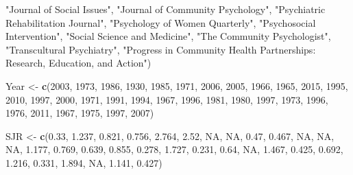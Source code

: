 \documentclass[]{tufte-handout}
\newenvironment{Shaded}{}{}
\newcommand{\KeywordTok}[1]{\textbf{{#1}}}
\newcommand{\DecValTok}[1]{{#1}}
\newcommand{\FloatTok}[1]{{#1}}
\newcommand{\StringTok}[1]{{#1}}
\newcommand{\OtherTok}[1]{{#1}}
\newcommand{\NormalTok}[1]{{#1}}
\begin{document}
\begin{Shaded}
\begin{Highlighting}[]
             \StringTok{"Journal of Social Issues"}\NormalTok{,}
             \StringTok{"Journal of Community Psychology"}\NormalTok{,}
             \StringTok{"Psychiatric Rehabilitation Journal"}\NormalTok{,}
             \StringTok{"Psychology of Women Quarterly"}\NormalTok{,}
             \StringTok{"Psychosocial Intervention"}\NormalTok{,}
             \StringTok{"Social Science and Medicine"}\NormalTok{,}
             \StringTok{"The Community Psychologist"}\NormalTok{,}
             \StringTok{"Transcultural Psychiatry"}\NormalTok{,}
             \StringTok{"Progress in Community Health Partnerships: Research, Education, and Action"}\NormalTok{)}
\end{Highlighting}
\end{Shaded}

\begin{Shaded}
\begin{Highlighting}[]
\NormalTok{Year <-}\StringTok{ }\KeywordTok{c}\NormalTok{(}\DecValTok{2003}\NormalTok{, }\DecValTok{1973}\NormalTok{, }\DecValTok{1986}\NormalTok{, }\DecValTok{1930}\NormalTok{, }\DecValTok{1985}\NormalTok{, }\DecValTok{1971}\NormalTok{, }\DecValTok{2006}\NormalTok{, }\DecValTok{2005}\NormalTok{, }\DecValTok{1966}\NormalTok{, }\DecValTok{1965}\NormalTok{, }\DecValTok{2015}\NormalTok{, }
    \DecValTok{1995}\NormalTok{, }\DecValTok{2010}\NormalTok{, }\DecValTok{1997}\NormalTok{, }\DecValTok{2000}\NormalTok{, }\DecValTok{1971}\NormalTok{, }\DecValTok{1991}\NormalTok{, }\DecValTok{1994}\NormalTok{, }\DecValTok{1967}\NormalTok{, }\DecValTok{1996}\NormalTok{, }\DecValTok{1981}\NormalTok{, }\DecValTok{1980}\NormalTok{, }\DecValTok{1997}\NormalTok{, }
    \DecValTok{1973}\NormalTok{, }\DecValTok{1996}\NormalTok{, }\DecValTok{1976}\NormalTok{, }\DecValTok{2011}\NormalTok{, }\DecValTok{1967}\NormalTok{, }\DecValTok{1975}\NormalTok{, }\DecValTok{1997}\NormalTok{, }\DecValTok{2007}\NormalTok{)}

\NormalTok{SJR <-}\StringTok{ }\KeywordTok{c}\NormalTok{(}\FloatTok{0.33}\NormalTok{, }\FloatTok{1.237}\NormalTok{, }\FloatTok{0.821}\NormalTok{, }\FloatTok{0.756}\NormalTok{, }\FloatTok{2.764}\NormalTok{, }\FloatTok{2.52}\NormalTok{, }\OtherTok{NA}\NormalTok{, }\OtherTok{NA}\NormalTok{, }\FloatTok{0.47}\NormalTok{, }\FloatTok{0.467}\NormalTok{, }\OtherTok{NA}\NormalTok{, }
    \OtherTok{NA}\NormalTok{, }\OtherTok{NA}\NormalTok{, }\FloatTok{1.177}\NormalTok{, }\FloatTok{0.769}\NormalTok{, }\FloatTok{0.639}\NormalTok{, }\FloatTok{0.855}\NormalTok{, }\FloatTok{0.278}\NormalTok{, }\FloatTok{1.727}\NormalTok{, }\FloatTok{0.231}\NormalTok{, }\FloatTok{0.64}\NormalTok{, }\OtherTok{NA}\NormalTok{, }
    \FloatTok{1.467}\NormalTok{, }\FloatTok{0.425}\NormalTok{, }\FloatTok{0.692}\NormalTok{, }\FloatTok{1.216}\NormalTok{, }\FloatTok{0.331}\NormalTok{, }\FloatTok{1.894}\NormalTok{, }\OtherTok{NA}\NormalTok{, }\FloatTok{1.141}\NormalTok{, }\FloatTok{0.427}\NormalTok{)}


\end{Highlighting}
\end{Shaded}
\end{document}
